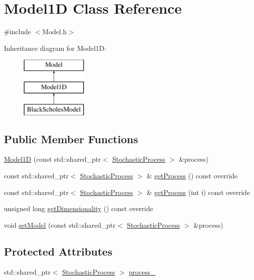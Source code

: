 \hypertarget{class_model1_d}{}\section{Model1D Class Reference}
\label{class_model1_d}


{\ttfamily \#include $<$Model.\+h$>$}

Inheritance diagram for Model1D\+:\begin{figure}[H]
\begin{center}
\leavevmode
\includegraphics[height=3.000000cm]{class_model1_d}
\end{center}
\end{figure}
\subsection*{Public Member Functions}
\begin{DoxyCompactItemize}
\item 
\hyperlink{class_model1_d_aca6508f11a4b419dacdc830afbe0af36}{Model1D} (const std\+::shared\+\_\+ptr$<$ \hyperlink{class_stochastic_process}{Stochastic\+Process} $>$ \&process)
\item 
const std\+::shared\+\_\+ptr$<$ \hyperlink{class_stochastic_process}{Stochastic\+Process} $>$ \& \hyperlink{class_model1_d_ae3cdfcb2922f03a68b8e8e02d572746f}{get\+Process} () const override
\item 
const std\+::shared\+\_\+ptr$<$ \hyperlink{class_stochastic_process}{Stochastic\+Process} $>$ \& \hyperlink{class_model1_d_a08b3a9f594214b5e3bcba3fe5f63524e}{get\+Process} (int i) const override
\item 
unsigned long \hyperlink{class_model1_d_ac81875523be6153cb58d0f37914eb9a1}{get\+Dimensionality} () const override
\item 
void \hyperlink{class_model1_d_af0665a1beba2852b5382d4590e9fbbce}{set\+Model} (const std\+::shared\+\_\+ptr$<$ \hyperlink{class_stochastic_process}{Stochastic\+Process} $>$ \&process)
\end{DoxyCompactItemize}
\subsection*{Protected Attributes}
\begin{DoxyCompactItemize}
\item 
std\+::shared\+\_\+ptr$<$ \hyperlink{class_stochastic_process}{Stochastic\+Process} $>$ \hyperlink{class_model1_d_ad646c53c0c7d97d7699ccf4d77e22bf2}{process\+\_\+}
\end{DoxyCompactItemize}


